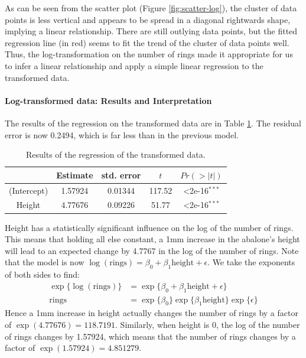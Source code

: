 \documentclass[11pt,letterpaper]{article}
\begin{document}
	As can be seen from the scatter plot (Figure \ref{fig:scatter-log}), the cluster of data points is less vertical and appears to be spread in a diagonal rightwards shape, implying a linear relationship. There are still outlying data points, but the fitted regression line (in red) seems to fit the trend of the cluster of data points well. Thus, the log-transformation on the number of rings made it appropriate for us to infer a linear relationship and  apply a simple linear regression to the transformed data.
	
	\paragraph*{Log-transformed data: Results and Interpretation}
	The results of the regression on the transformed data are in Table \ref{tab:log-ols}. The residual error is now 0.2494, which is far less than in the previous model.  
	
	\begin{table}[hb]
		\caption{Results of the regression of the transformed data.}
		\centering
		\begin{tabular}{ccccc}
			\midrule
			~& Estimate & std. error & $t$ & $Pr(>|t|)$\\
			\midrule
			(Intercept) & 1.57924 & 0.01344 & 117.52 & \textless2e-16$^{***}$\\
			Height & 4.77676 & 0.09226 & 51.77 & \textless2e-16$^{***}$\\
			\midrule
		\end{tabular}
		\label{tab:log-ols}
	\end{table}
	
	Height has a statistically significant influence on the log of the number of rings. This means that holding all else constant, a 1mm increase in the abalone's height will lead to an expected change by 4.7767 in the log of the number of rings. Note that the model is now $\log(\text{rings}) = \beta_0 + \beta_1 \text{height} + \epsilon$. We take the exponents of both sides to find:
	\begin{align*}
		\exp\{\log(\text{rings})\} &= \exp\{\beta_0 + \beta_1 \text{height} + \epsilon\} \\
		\text{rings} &= \exp\{\beta_0\}\exp\{\beta_1 \text{height}\}\exp\{\epsilon\}
	\end{align*} 
  Hence a 1mm increase in height actually changes the number of rings by a factor of $\exp(4.77676) = 118.7191$. Similarly, when height is 0, the log of the number of rings changes by 1.57924, which means that the number of rings changes by a factor of $\exp(1.57924) = 4.851279$.
  
\end{document}
